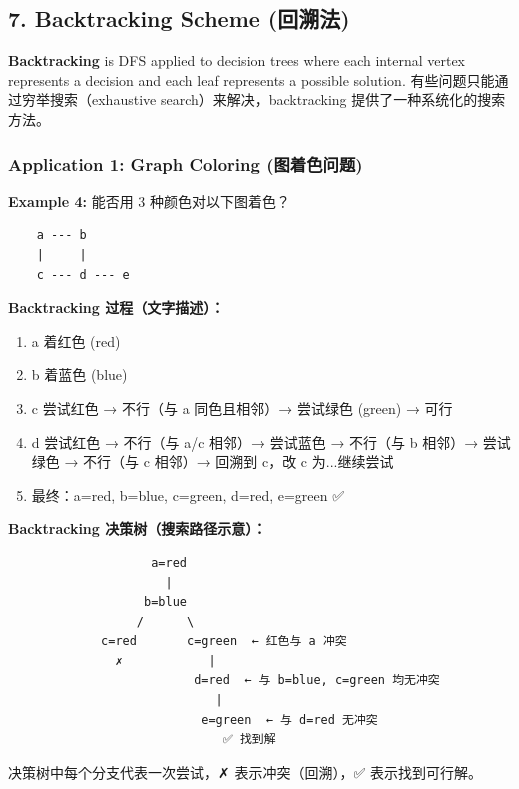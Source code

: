 \documentclass[10pt,a4paper,openany]{ctexbook}
\theoremstyle{definition}
\theoremstyle{remark}
\renewenvironment{quote}
  {\list{}{\leftmargin=1em\rightmargin=0pt\topsep=0.5pt\partopsep=0pt}\item[]}
  {\endlist}
\begin{document}
\vspace{-2pt}

\subsection{7. Backtracking Scheme (回溯法)}

\textbf{Backtracking} is DFS applied to decision trees where each internal vertex represents a decision and each leaf represents a possible solution.
有些问题只能通过穷举搜索（exhaustive search）来解决，backtracking 提供了一种系统化的搜索方法。
\subsubsection{Application 1: Graph Coloring (图着色问题)}

\textbf{Example 4:} 能否用 3 种颜色对以下图着色？
{\footnotesize\begin{verbatim}
    a --- b
    |     |
    c --- d --- e
\end{verbatim}}

\textbf{Backtracking 过程（文字描述）：}
\begin{enumerate}
\item a 着红色 (red)
\item b 着蓝色 (blue)
\item c 尝试红色 → 不行（与 a 同色且相邻）→ 尝试绿色 (green) → 可行
\item d 尝试红色 → 不行（与 a/c 相邻）→ 尝试蓝色 → 不行（与 b 相邻）→ 尝试绿色 → 不行（与 c 相邻）→ 回溯到 c，改 c 为...继续尝试
\item 最终：a=red, b=blue, c=green, d=red, e=green ✅

\end{enumerate}

\textbf{Backtracking 决策树（搜索路径示意）：}
{\footnotesize\begin{verbatim}
                    a=red
                      |
                   b=blue
                  /      \
             c=red       c=green  ← 红色与 a 冲突
               ✗            |
                          d=red  ← 与 b=blue, c=green 均无冲突
                             |
                           e=green  ← 与 d=red 无冲突
                              ✅ 找到解
\end{verbatim}}

\begin{quote}
决策树中每个分支代表一次尝试，✗ 表示冲突（回溯），✅ 表示找到可行解。

\end{quote}
\end{document}
